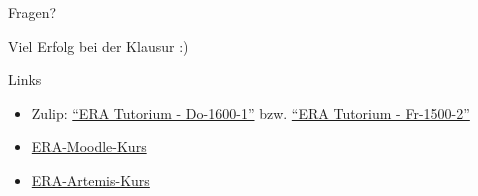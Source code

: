 \documentclass[
  german,            %
  aspectratio=169,    %
]{tumbeamer}
\begin{document}
\begin{frame}[c]{}{}
	\begin{center}
		\LARGE Fragen?
	\end{center}
\end{frame}


\begin{frame}[c]{}{}
	\begin{center}
		\LARGE Viel Erfolg bei der Klausur :)
	\end{center}
\end{frame}

\begin{frame}[c, fragile]{Links}{}
	\begin{itemize}
		\item Zulip: \href{https://zulip.in.tum.de/#narrow/stream/2661-ERA-Tutorium---Do-1600-1}{\enquote{ERA Tutorium - Do-1600-1}}
		      bzw. \href{https://zulip.in.tum.de/#narrow/stream/2675-ERA-Tutorium---Fr-1500-2 }{\enquote{ERA Tutorium - Fr-1500-2}}
		\item \href{https://www.moodle.tum.de/course/view.php?id=100633}{ERA-Moodle-Kurs}
		\item \href{https://artemis.in.tum.de/courses/401}{ERA-Artemis-Kurs}
	\end{itemize}
\end{frame}

\maketitle
\end{document}

